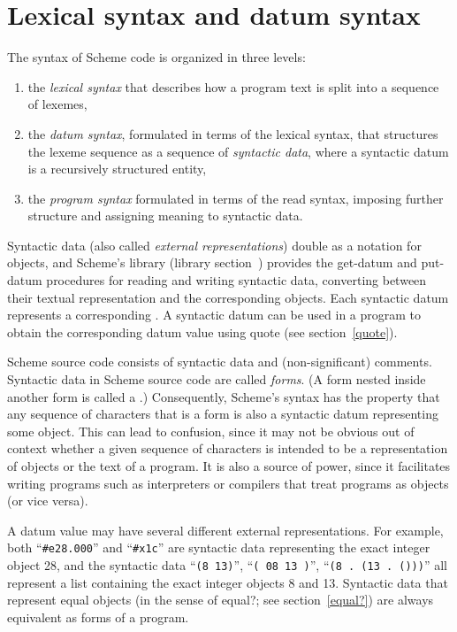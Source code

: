 \chapter{Lexical syntax and datum syntax}
\label{readsyntaxchapter}

The syntax of Scheme code is organized in three levels:
%
\begin{enumerate}
\item the \textit{lexical syntax} that describes how a program text is split
  into a sequence of lexemes,
\item the \textit{datum syntax}, formulated in terms of the lexical
  syntax, that structures the lexeme sequence as a sequence of
  \textit{syntactic data}, where a syntactic datum is
    a recursively structured entity,
\item the \textit{program syntax} formulated in terms of the read
  syntax, imposing further structure and assigning meaning to
  syntactic data.
\end{enumerate}
%
Syntactic data (also called \textit{external
  representations}) double
as a notation for objects, and Scheme's  library
(library section~)
provides the {\cf get-datum} and {\cf put-datum} procedures
for reading and writing syntactic data, converting between their
textual representation and the corresponding objects. 
Each syntactic datum represents a corresponding .
A syntactic datum can be used in a program to obtain the corresponding
datum value using {\cf quote} (see section~\ref{quote}).

Scheme source code consists of syntactic data and (non-significant) comments.
Syntactic data in Scheme source code are called
\textit{forms}.
(A form nested inside another form is
called a .)
Consequently, Scheme's syntax has the property that any sequence of
characters that is a form is also a syntactic datum representing
some object.  This can lead to confusion, since it may not be obvious
out of context whether a given sequence of characters is intended to
be a representation of objects or the text of a program.
It is also a source of power, since it
facilitates writing programs such as interpreters or compilers that
treat programs as objects (or vice versa).

A datum value may have several different external representations.
For example, both ``{\tt \#e28.000}'' and
``{\tt\#x1c}'' are syntactic data representing the exact integer
object 28, and the syntactic data ``{\tt(8 13)}'', ``{\tt( 08 13 )}'', ``{\tt(8 .\
  (13 .\ ()))}''
all represent a list containing the exact integer objects 8 and 13. 
Syntactic data that represent equal objects (in the sense of {\cf
  equal?}; see section~\ref{equal?}) are always equivalent 
as forms of a program.

